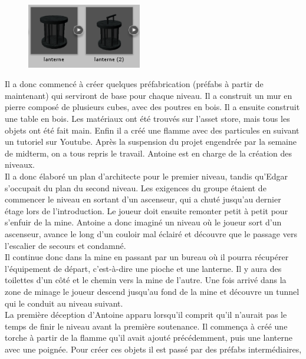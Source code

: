 \documentclass[titlepage, 13px, a4paper]{article}
\begin{document}
\paragraph{} \hspace{0pt} \\
\begin{figure}
\includegraphics[width=5cm]{lanterne-ant.png}
\end{figure}
Il a donc commencé à créer quelques préfabrication (préfabs à partir de maintenant) qui serviront de base 
pour chaque niveau. Il a construit un mur en pierre composé de plusieurs cubes, avec des poutres en bois. 
Il a ensuite construit une table en bois. Les matériaux ont été trouvés sur l'asset store, 
mais tous les objets ont été fait main. Enfin il a créé une flamme avec des particules 
en suivant un tutoriel sur Youtube. Après la suspension du projet engendrée par la semaine de midterm, 
on a tous repris le travail. Antoine est en charge de la création des niveaux. \\
Il a donc élaboré un plan d'architecte pour le premier niveau, tandis qu'Edgar s'occupait du plan du second niveau. 
Les exigences du groupe étaient de commencer le niveau en sortant d'un ascenseur, qui a chuté jusqu'au dernier étage 
lors de l'introduction. Le joueur doit ensuite remonter petit à petit pour s'enfuir de la mine. 
Antoine a donc imaginé un niveau où le joueur sort d'un ascenseur, avance le long d'un couloir mal éclairé 
et découvre que le passage vers l'escalier de secours et condamné. \\
Il continue donc dans la mine en passant par un bureau où il pourra récupérer l'équipement de départ, 
c'est-à-dire une pioche et une lanterne. Il y aura des toilettes d'un côté et le chemin vers la mine de l'autre. 
Une fois arrivé dans la zone de minage le joueur descend jusqu'au fond de la mine et 
découvre un tunnel qui le conduit au niveau suivant. \\
La première déception d'Antoine apparu lorsqu'il comprit qu'il n'aurait pas le temps de finir le niveau 
avant la première soutenance. Il commença à créé une torche à partir de la flamme qu'il avait ajouté précédemment, 
puis une lanterne avec une poignée. Pour créer ces objets il est passé par des préfabs intermédiaires, 
\end{document}
